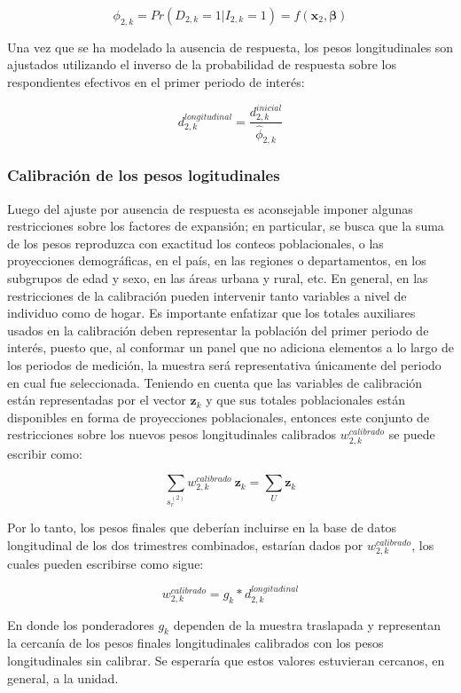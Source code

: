 \documentclass[
  12pt,
  spanish,
]{book}
\begin{document}
\[
\phi_{2, k} = Pr(D_{2, k} = 1|I_{2, k} = 1) = f(\mathbf{x}_{2}, \boldsymbol\beta)
\]

Una vez que se ha modelado la ausencia de respuesta, los pesos longitudinales son ajustados utilizando el inverso de la probabilidad de respuesta sobre los respondientes efectivos en el primer periodo de interés:

\[
d_{2, k}^{longitudinal} = \frac{d_{2, k}^{inicial}}{\hat{\phi}_{2, k} }
\]

\hypertarget{calibraciuxf3n-de-los-pesos-logitudinales}{%
\subsubsection{Calibración de los pesos logitudinales}\label{calibraciuxf3n-de-los-pesos-logitudinales}}

Luego del ajuste por ausencia de respuesta es aconsejable imponer algunas restricciones sobre los factores de expansión; en particular, se busca que la suma de los pesos reproduzca con exactitud los conteos poblacionales, o las proyecciones demográficas, en el país, en las regiones o departamentos, en los subgrupos de edad y sexo, en las áreas urbana y rural, etc. En general, en las restricciones de la calibración pueden intervenir tanto variables a nivel de individuo como de hogar. Es importante enfatizar que los totales auxiliares usados en la calibración deben representar la población del primer periodo de interés, puesto que, al conformar un panel que no adiciona elementos a lo largo de los periodos de medición, la muestra será representativa únicamente del periodo en cual fue seleccionada. Teniendo en cuenta que las variables de calibración están representadas por el vector \(\mathbf{z}_k\) y que sus totales poblacionales están disponibles en forma de proyecciones poblacionales, entonces este conjunto de restricciones sobre los nuevos pesos longitudinales calibrados \(w_{2, k}^{calibrado}\) se puede escribir como:

\[
\sum_{s_r^{(2)}} w_{2, k}^{calibrado} \  \mathbf{z}_k = \sum_{U} \mathbf{z}_k
\]

Por lo tanto, los pesos finales que deberían incluirse en la base de datos longitudinal de los dos trimestres combinados, estarían dados por \(w_{2, k}^{calibrado}\), los cuales pueden escribirse como sigue:

\[
w_{2, k}^{calibrado} = g_k * d_{2, k}^{longitudinal}
\]

En donde los ponderadores \(g_k\) dependen de la muestra traslapada y representan la cercanía de los pesos finales longitudinales calibrados con los pesos longitudinales sin calibrar. Se esperaría que estos valores estuvieran cercanos, en general, a la unidad.
\end{document}
